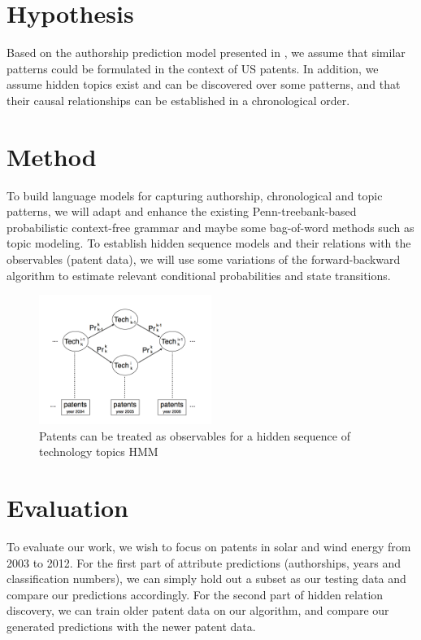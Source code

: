 \documentclass[conference]{IEEEtran}
\begin{document}
\section{Hypothesis}
Based on the authorship prediction model presented in \cite{Authorship}, we assume that similar patterns could be formulated in the context of US patents. In addition, we assume hidden topics exist and can be discovered over some patterns, and that their causal relationships can be established in a chronological order. 

\section{Method}
To build language models for capturing authorship, chronological and topic patterns, we will adapt and enhance the existing Penn-treebank-based probabilistic context-free grammar and maybe some bag-of-word methods such as topic modeling. To establish hidden sequence models \cite{HMM} and their relations with the observables (patent data), we will use some variations of the forward-backward algorithm to estimate relevant conditional probabilities and state transitions. 

\begin{figure} 
  \includegraphics[width=0.5\textwidth]{hmm.png}
   \caption{Patents can be treated as observables for a hidden sequence of technology topics HMM}
\end{figure}

\section{Evaluation}
To evaluate our work, we wish to focus on patents in solar and wind energy from 2003 to 2012. For the first part of attribute predictions (authorships, years and classification numbers), we can simply hold out a subset as our testing data and compare our predictions accordingly. For the second part of hidden relation discovery, we can train older patent data on our algorithm, and compare our generated predictions with the newer patent data.
\end{document}
